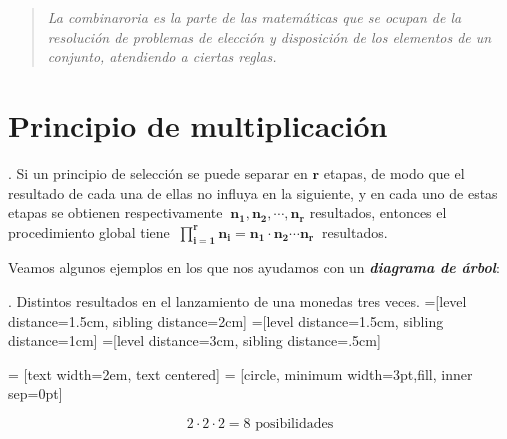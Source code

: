 \begin{quotation}
	\emph{La combinaroria es la parte de las matemáticas que se ocupan de la resolución de problemas de elección y disposición de los elementos de un conjunto, atendiendo a ciertas reglas.}	
\end{quotation}

\section{Principio de multiplicación}

\begin{definition}
	. Si un principio de selección se puede separar en $\boldsymbol{r}$ etapas, de modo que el resultado de cada una de ellas no influya en la siguiente, y en cada uno de estas etapas se obtienen respectivamente $\ \boldsymbol{n_1,n_2,\cdots ,n_r}$ resultados, entonces el procedimiento global tiene $\ \displaystyle \boldsymbol{\prod_{i=1}^r n_i= n_1 \cdot n_2  \cdots  n_r}\ $ resultados.
\end{definition}

Veamos algunos ejemplos en los que nos ayudamos con un \textbf{\emph{diagrama de árbol}}:

\begin{example}
	. Distintos resultados en el lanzamiento de una monedas tres veces.
\vspace{4mm}
=[level distance=1.5cm, sibling distance=2cm]
=[level distance=1.5cm, sibling distance=1cm]
=[level distance=3cm, sibling distance=.5cm]

 = [text width=2em, text centered]
 = [circle, minimum width=3pt,fill, inner sep=0pt]

$$2\cdot 2\cdot 2 = 8 \text{ posibilidades}$$
\end{example}

